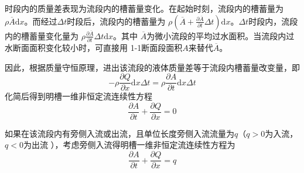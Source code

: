                                                         时段内的质量差表现为流段内的槽蓄量变化。在起始时刻，流段内的槽蓄量为
                                                        $\rho\overline{A}\mathrm{d}x$。而经过$\Delta t$时段后，流段内的槽蓄量为
                                                        $\rho\left(\overline{A}+\frac{\partial\overline{A}}{\partial t}\Delta
                                                        t\right)\mathrm{d}x$。$\Delta t$时段内，流段内的槽蓄量变化量为
                                                        $\rho\frac{\partial \overline{A}}{\partial t}\Delta t\mathrm{d}x$。其中
                                                        $\overline{A}$为微小流段的平均过水面积。当流段内过水断面面积变化较小时，可直接用
                                                        1-1断面段面积$A$来替代$\overline{A}$。

                                                        因此，根据质量守恒原理，进出该流段的液体质量差等于流段内槽蓄量改变量，即
                                                        \begin{equation*}
                                                          -\rho\frac{\partial Q}{\partial x}\mathrm{d}x\Delta t
                                                          =
                                                          \rho\frac{\partial A}{\partial t}\mathrm{d}x\Delta t
                                                        \end{equation*}
                                                        化简后得到明槽一维非恒定流连续性方程
                                                        \begin{equation}
                                                          \frac{\partial A}{\partial t}
                                                          +
                                                          \frac{\partial Q}{\partial x}
                                                          =
                                                          0
                                                          \label{EqCGe_SVe_Ce}
                                                        \end{equation}

                                                        如果在该流段内有旁侧入流或出流，且单位长度旁侧入流流量为$q$（$q>0$为入流，$q<0$为出流
                                                        ），考虑旁侧入流得明槽一维非恒定流连续性方程为
                                                        \begin{equation}
                                                          \frac{\partial A}{\partial t}
                                                          +
                                                          \frac{\partial Q}{\partial x}
                                                          =
                                                          q
                                                        \end{equation}


